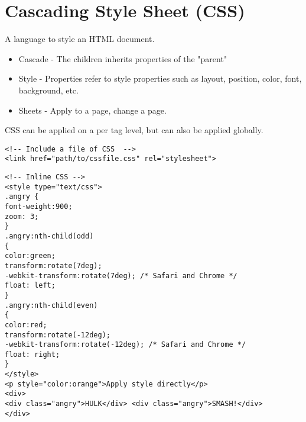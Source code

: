 \documentclass[../CMPUT-404-Notes.tex]{subfiles}
\begin{document}
\section{Cascading Style Sheet (CSS)}
A language to style an HTML document.
\begin{itemize}
  \item Cascade - The children inherits properties of the "parent"
  \item Style - Properties refer to style properties such as layout, position, color, font, background, etc.
  \item Sheets - Apply to a page, change a page. 
\end{itemize}

CSS can be applied on a per tag level, but can also be applied globally. 

\begin{verbatim}
<!-- Include a file of CSS  -->
<link href="path/to/cssfile.css" rel="stylesheet">
\end{verbatim}

\begin{verbatim}
<!-- Inline CSS -->
<style type="text/css">
.angry {
font-weight:900;
zoom: 3;
}
.angry:nth-child(odd)
{
color:green;
transform:rotate(7deg);
-webkit-transform:rotate(7deg); /* Safari and Chrome */
float: left;
}
.angry:nth-child(even)
{
color:red;
transform:rotate(-12deg);
-webkit-transform:rotate(-12deg); /* Safari and Chrome */
float: right;
} 
</style>
<p style="color:orange">Apply style directly</p>
<div>
<div class="angry">HULK</div> <div class="angry">SMASH!</div>
</div>
\end{verbatim}
\end{document}
